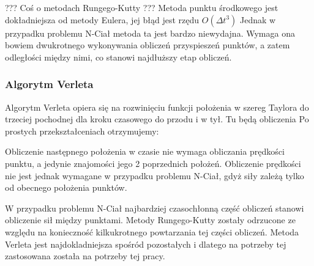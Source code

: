 \begin{center}

\end{center}

 ??? Coś o metodach Rungego-Kutty ???
Metoda punktu środkowego jest dokładniejsza od metody Eulera, jej błąd jest rzędu $ O( \Delta t ^{3} ) $
Jednak w przypadku problemu N-Ciał metoda ta jest bardzo niewydajna. Wymaga ona bowiem dwukrotnego wykonywania obliczeń przyspieszeń punktów, a zatem odległości między nimi, co stanowi najdłuższy etap obliczeń.

\subsubsection {Algorytm Verleta}
Algorytm Verleta opiera się na rozwinięciu funkcji położenia w szereg Taylora do trzeciej pochodnej dla kroku czasowego do przodu i w tył.
\linebreak
Tu będą obliczenia
\linebreak
Po prostych przekształceniach otrzymujemy:
\begin{center}

\end{center}

Obliczenie następnego położenia w czasie nie wymaga obliczania prędkości punktu, a jedynie znajomości jego 2 poprzednich położeń. 
Obliczenie prędkości nie jest jednak wymagane w przypadku problemu N-Ciał, gdyż siły zależą tylko od obecnego położenia punktów. 
\linebreak

W przypadku problemu N-Ciał najbardziej czasochłonną część obliczeń stanowi obliczenie sił między punktami. Metody Rungego-Kutty zostały odrzucone ze względu na konieczność kilkukrotnego powtarzania tej części obliczeń. Metoda Verleta jest najdokladniejsza spośród pozostałych i dlatego na potrzeby tej zastosowana została na potrzeby tej pracy.

